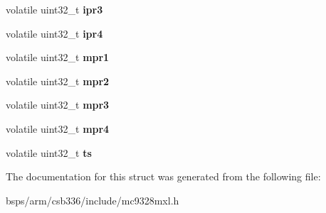 \begin{DoxyCompactItemize}
volatile uint32\+\_\+t {\bfseries ipr3}
\item 
\mbox{\label{structmc9328mxl__uart__regs__t_ac0f0cb5b8ca2e90c4ead61bbe1a21045}} 
volatile uint32\+\_\+t {\bfseries ipr4}
\item 
\mbox{\label{structmc9328mxl__uart__regs__t_ab837ae4341d3d281d7772e3d3bf669b8}} 
volatile uint32\+\_\+t {\bfseries mpr1}
\item 
\mbox{\label{structmc9328mxl__uart__regs__t_a296e8de90a944dffd5e8a00af6cc113a}} 
volatile uint32\+\_\+t {\bfseries mpr2}
\item 
\mbox{\label{structmc9328mxl__uart__regs__t_af5a8b1fabe400016cc6c7ab8145589a5}} 
volatile uint32\+\_\+t {\bfseries mpr3}
\item 
\mbox{\label{structmc9328mxl__uart__regs__t_a1f3840a2264589602d14ddd8e929bfce}} 
volatile uint32\+\_\+t {\bfseries mpr4}
\item 
\mbox{\label{structmc9328mxl__uart__regs__t_a2e40284c9784c26917143d59d9b4195a}} 
volatile uint32\+\_\+t {\bfseries ts}
\end{DoxyCompactItemize}


The documentation for this struct was generated from the following file\+:\begin{DoxyCompactItemize}
\item 
bsps/arm/csb336/include/mc9328mxl.\+h\end{DoxyCompactItemize}
